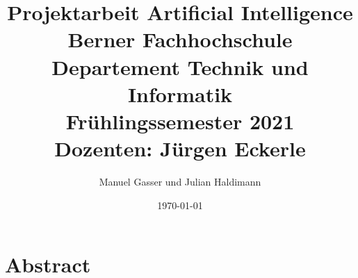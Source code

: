 \documentclass[12pt]{report}
\title{
    \hfill \break
    {Projektarbeit Artificial Intelligence}\\
    {\large Berner Fachhochschule Departement Technik und Informatik}\\
    {\large Frühlingssemester 2021}\\
    {\large Dozenten: Jürgen Eckerle}\\
}
\author{Manuel Gasser und Julian Haldimann}
\date{\today}
\begin{document}
    \maketitle

    \chapter{Abstract}
    

    \tableofcontents
    
	
	

    \printglossaries

    \listoftables

    \listoffigures
\end{document}
